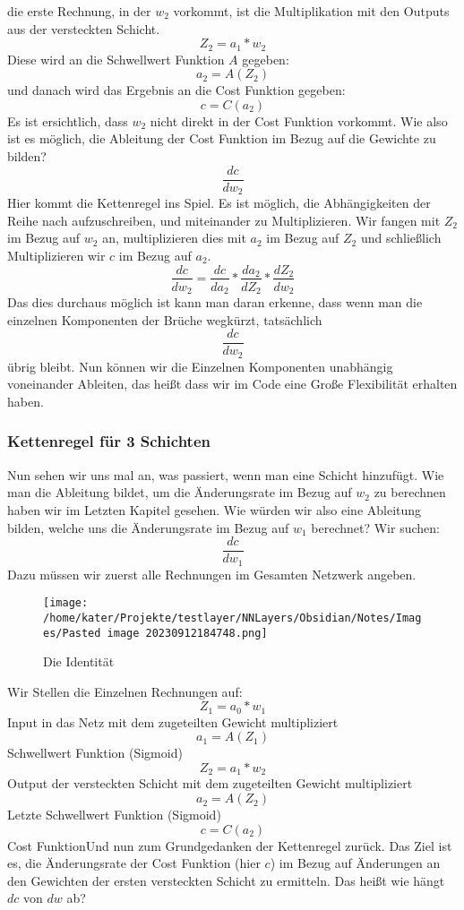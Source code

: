 \documentclass[12pt]{article}
\begin{document}
die erste Rechnung, in der $w_2$ vorkommt, ist die Multiplikation mit den Outputs aus der versteckten Schicht.
$$Z_2 = a_1*w_2$$
Diese wird an die Schwellwert Funktion $A$ gegeben:
$$a_2 = A(Z_2)$$
und danach wird das Ergebnis an die Cost Funktion gegeben:
$$c=C(a_2)$$
Es ist ersichtlich, dass $w_2$ nicht direkt in der Cost Funktion vorkommt. Wie also ist es möglich, die Ableitung der Cost Funktion im Bezug auf die Gewichte zu bilden?
$$\frac{dc}{dw_2}$$
Hier kommt die Kettenregel ins Spiel. Es ist möglich, die Abhängigkeiten der Reihe nach aufzuschreiben, und miteinander zu Multiplizieren. 
Wir fangen mit $Z_2$ im Bezug auf $w_2$ an, multiplizieren dies mit $a_2$ im Bezug auf $Z_2$ und schließlich Multiplizieren wir $c$ im Bezug auf $a_2$.
$$\frac{ dc }{ dw_{ 2 } }=
\frac{ dc }{ da_{ 2 } }*
\frac{ da_{ 2 } }{ dZ_{ 2 } }*
\frac{ dZ_{ 2 } }{ dw_{ 2 } }$$
Das dies durchaus möglich ist kann man daran erkenne, dass wenn man die einzelnen Komponenten der Brüche wegkürzt, tatsächlich $$\frac{ dc }{ dw_{ 2 } }$$  übrig bleibt.
Nun können wir die Einzelnen Komponenten unabhängig voneinander Ableiten, das heißt dass wir im Code eine Große Flexibilität erhalten haben.\subsubsection{ Kettenregel für 3 Schichten}Nun sehen wir uns mal an, was passiert, wenn man eine Schicht hinzufügt. Wie man die Ableitung bildet, um die Änderungsrate im Bezug auf $w_2$ zu berechnen haben wir im Letzten Kapitel gesehen. Wie würden wir also eine Ableitung bilden, welche uns die Änderungsrate im Bezug auf $w_1$ berechnet?
Wir suchen:$$\frac{ dc }{ dw_{ 1 } }$$
Dazu müssen wir zuerst alle Rechnungen im Gesamten Netzwerk angeben.\begin{figure}[H]
\centering
\texttt{[image: /home/kater/Projekte/testlayer/NNLayers/Obsidian/Notes/Images/Pasted image 20230912184748.png]}
\caption{Die Identität}
\label{Was kommt hier rein?}\end{figure}Wir Stellen die Einzelnen Rechnungen auf:
$$Z_1 = a_0*w_1$$
Input in das Netz mit dem zugeteilten Gewicht multipliziert
$$a_1=A(Z_1)$$
Schwellwert Funktion (Sigmoid)
$$Z_2=a_1*w_2$$
Output der versteckten Schicht mit dem zugeteilten Gewicht  multipliziert
$$a_2=A(Z_2)$$
Letzte Schwellwert Funktion (Sigmoid)
$$c=C(a_2)$$
Cost FunktionUnd nun zum Grundgedanken der Kettenregel zurück. Das Ziel ist es, die Änderungsrate der Cost Funktion (hier $c$) im Bezug auf Änderungen an den Gewichten der ersten versteckten Schicht zu ermitteln. Das heißt wie hängt $dc$ von $dw$ ab?
\end{document}
